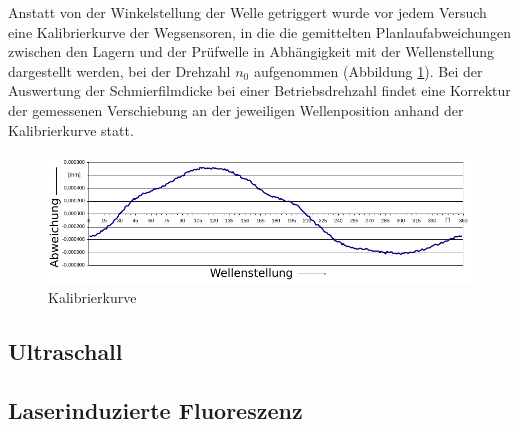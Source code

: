 Anstatt von der Winkelstellung der Welle getriggert wurde vor jedem Versuch eine Kalibrierkurve der Wegsensoren, in die die gemittelten Planlaufabweichungen zwischen den Lagern und der Prüfwelle in Abhängigkeit mit der Wellenstellung dargestellt werden, bei der Drehzahl $n_0$ aufgenommen (Abbildung \ref{fig:kalibrierkurve_kuhlmann}).
Bei der Auswertung der Schmierfilmdicke bei einer Betriebsdrehzahl findet eine Korrektur der gemessenen Verschiebung an der jeweiligen Wellenposition anhand der Kalibrierkurve statt.
\begin{figure}[htb]
    \centering
    \includegraphics[]{./images/kalibrierkurve_kuhlmann.pdf}
    \caption{Kalibrierkurve \cite{kuhlmann_2009}}
    \label{fig:kalibrierkurve_kuhlmann}
\end{figure}
%

\subsection{Ultraschall}
\label{sub:ultraschall}

\subsection{Laserinduzierte Fluoreszenz}
\label{sub:laserinduzierte_fluoreszenz}
